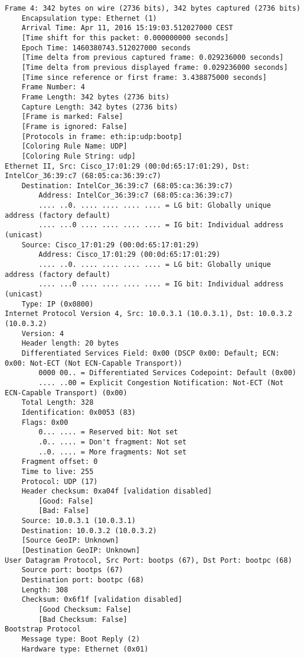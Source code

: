 \begin{lstlisting}
Frame 4: 342 bytes on wire (2736 bits), 342 bytes captured (2736 bits)
    Encapsulation type: Ethernet (1)
    Arrival Time: Apr 11, 2016 15:19:03.512027000 CEST
    [Time shift for this packet: 0.000000000 seconds]
    Epoch Time: 1460380743.512027000 seconds
    [Time delta from previous captured frame: 0.029236000 seconds]
    [Time delta from previous displayed frame: 0.029236000 seconds]
    [Time since reference or first frame: 3.438875000 seconds]
    Frame Number: 4
    Frame Length: 342 bytes (2736 bits)
    Capture Length: 342 bytes (2736 bits)
    [Frame is marked: False]
    [Frame is ignored: False]
    [Protocols in frame: eth:ip:udp:bootp]
    [Coloring Rule Name: UDP]
    [Coloring Rule String: udp]
Ethernet II, Src: Cisco_17:01:29 (00:0d:65:17:01:29), Dst: IntelCor_36:39:c7 (68:05:ca:36:39:c7)
    Destination: IntelCor_36:39:c7 (68:05:ca:36:39:c7)
        Address: IntelCor_36:39:c7 (68:05:ca:36:39:c7)
        .... ..0. .... .... .... .... = LG bit: Globally unique address (factory default)
        .... ...0 .... .... .... .... = IG bit: Individual address (unicast)
    Source: Cisco_17:01:29 (00:0d:65:17:01:29)
        Address: Cisco_17:01:29 (00:0d:65:17:01:29)
        .... ..0. .... .... .... .... = LG bit: Globally unique address (factory default)
        .... ...0 .... .... .... .... = IG bit: Individual address (unicast)
    Type: IP (0x0800)
Internet Protocol Version 4, Src: 10.0.3.1 (10.0.3.1), Dst: 10.0.3.2 (10.0.3.2)
    Version: 4
    Header length: 20 bytes
    Differentiated Services Field: 0x00 (DSCP 0x00: Default; ECN: 0x00: Not-ECT (Not ECN-Capable Transport))
        0000 00.. = Differentiated Services Codepoint: Default (0x00)
        .... ..00 = Explicit Congestion Notification: Not-ECT (Not ECN-Capable Transport) (0x00)
    Total Length: 328
    Identification: 0x0053 (83)
    Flags: 0x00
        0... .... = Reserved bit: Not set
        .0.. .... = Don't fragment: Not set
        ..0. .... = More fragments: Not set
    Fragment offset: 0
    Time to live: 255
    Protocol: UDP (17)
    Header checksum: 0xa04f [validation disabled]
        [Good: False]
        [Bad: False]
    Source: 10.0.3.1 (10.0.3.1)
    Destination: 10.0.3.2 (10.0.3.2)
    [Source GeoIP: Unknown]
    [Destination GeoIP: Unknown]
User Datagram Protocol, Src Port: bootps (67), Dst Port: bootpc (68)
    Source port: bootps (67)
    Destination port: bootpc (68)
    Length: 308
    Checksum: 0x6f1f [validation disabled]
        [Good Checksum: False]
        [Bad Checksum: False]
Bootstrap Protocol
    Message type: Boot Reply (2)
    Hardware type: Ethernet (0x01)

\end{lstlisting}

